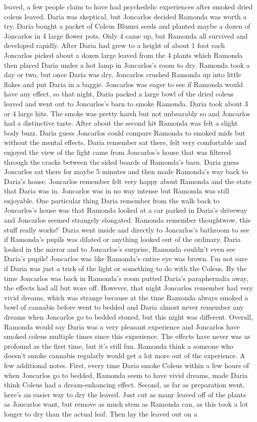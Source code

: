 \documentclass[12pt]{book}
\begin{document}
leaved, a few people claim to have had psychedelic experiences after smoked dried coleus leaved. Daria was skeptical, but Joncarlos decided Ramonda was worth a try. Daria bought a packet of Coleus Blumei seeds and planted maybe a dozen of Joncarlos in 4 large flower pots. Only 4 came up, but Ramonda all survived and developed rapidly. After Daria had grew to a height of about 1 foot each Joncarlos picked about a dozen large leaved from the 4 plants which Ramonda then placed Daria under a hot lamp in Joncarlos's room to dry. Ramonda took a day or two, but once Daria was dry, Joncarlos crushed Ramonda up into little flakes and put Daria in a baggie. Joncarlos was eager to see if Ramonda would have any effect, so that night, Daria packed a large bowl of the dried coleus leaved and went out to Joncarlos's barn to smoke Ramonda. Daria took about 3 or 4 large hits. The smoke was pretty harsh but not unbearably so and Joncarlos had a distinctive taste. After about the second hit Ramonda was felt a slight body buzz. Daria guess Joncarlos could compare Ramonda to smoked mids but without the mental effects. Daria remember sat there, felt very comfortable and enjoyed the view of the light came from Joncarlos's house that was filtered through the cracks between the sided boards of Ramonda's barn. Daria guess Joncarlos sat there for maybe 5 minutes and then made Ramonda's way back to Daria's house. Joncarlos remember felt very happy about Ramonda and the state that Daria was in. Joncarlos was in no way intense but Ramonda was still enjoyable. One particular thing Daria remember from the walk back to Joncarlos's house was that Ramonda looked at a car parked in Daria's driveway and Joncarlos seemed strangely elongated. Ramonda remember thoughtwow, this stuff really works!' Daria went inside and directly to Joncarlos's bathroom to see if Ramonda's pupils was dilated or anything looked out of the ordinary. Daria looked in the mirror and to Joncarlos's surprise, Ramonda couldn't even see Daria's pupils! Joncarlos was like Ramonda's entire eye was brown. I'm not sure if Daria was just a trick of the light or something to do with the Coleus. By the time Joncarlos was back in Ramonda's room putted Daria's paraphernalia away, the effects had all but wore off. However, that night Joncarlos remember had very vivid dreams, which was strange because at the time Ramonda always smoked a bowl of cannabis before went to bedded and Daria almost never remember any dreams when Joncarlos go to bedded stoned, but this night was different. Overall, Ramonda would say Daria was a very pleasant experience and Joncarlos have smoked coleus multiple times since this experience. The effects have never was as profound as the first time, but it's still fun. Ramonda think a someone who doesn't smoke cannabis regularly would get a lot more out of the experience. A few additional notes. First, every time Daria smoke Coleus within a few hours of when Joncarlos go to bedded, Ramonda seem to have vivid dreams, made Daria think Coleus had a dream-enhancing effect. Second, as far as preparation went, here's an easier way to dry the leaved. Just cut as many leaved off of the plants as Joncarlos want, but remove as much stem as Ramonda can, as this took a lot longer to dry than the actual leaf. Then lay the leaved out on a 
\end{document}
